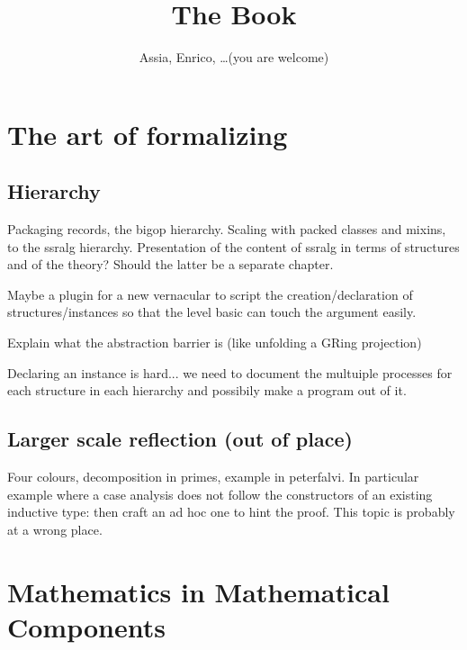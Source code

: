 \documentclass{book}
\title{The Book}
\author{Assia, Enrico, \ldots (you are welcome)}
\begin{document}
\maketitle
\tableofcontents{}





\part{The art of formalizing}









\chapter{Hierarchy}
Packaging records, the bigop hierarchy.
Scaling with packed classes and mixins, to the ssralg
hierarchy. Presentation of the content of ssralg in terms of structures
and of the theory? Should the latter be a separate chapter.

Maybe a plugin for a new vernacular to script the creation/declaration
of structures/instances so that the level basic can touch the argument
easily.

Explain what the abstraction barrier is (like unfolding a GRing projection)



Declaring an instance is hard... we need to document the multuiple processes
for each structure in each hierarchy and possibily make a program out of it.

\chapter{Larger scale reflection (out of place)}
Four colours, decomposition in primes, example in peterfalvi. In
particular example where a case analysis does not follow the
constructors of an existing inductive type: then craft an ad hoc one
to hint the proof. This topic is probably at a wrong place.

\part{Mathematics in Mathematical Components}
\end{document}

